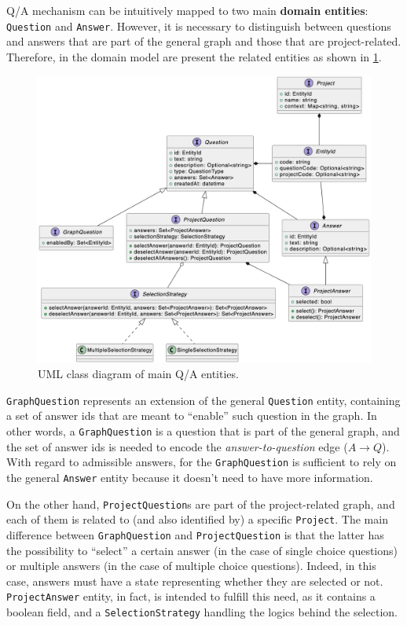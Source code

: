 \documentclass[12pt,a4paper,openright,twoside]{book}
\begin{document}
\ac{Q/A} mechanism can be intuitively mapped to two main \textbf{domain entities}: \texttt{Question} and \texttt{Answer}.
%
However, it is necessary to distinguish between questions and answers that are part of the general graph and those that are project-related.
%
Therefore, in the domain model are present the related entities as shown in \cref{fig:entities}.

\begin{figure}
    \centering
    \includegraphics[width=\linewidth]{figures/diagrams/entities.png}
    \caption{
        UML class diagram of main \ac{Q/A} entities.
    }
    \label{fig:entities}
\end{figure}

\texttt{GraphQuestion} represents an extension of the general \texttt{Question} entity, containing a set of answer ids that are meant to ``enable'' such question in the graph.
%
In other words, a \texttt{GraphQuestion} is a question that is part of the general graph, and the set of answer ids is needed to encode the \textit{answer-to-question} edge ($A \to Q$).
%
With regard to admissible answers, for the \texttt{GraphQuestion} is sufficient to rely on the general \texttt{Answer} entity because it doesn't need to have more information.

On the other hand, \texttt{ProjectQuestion}s are part of the project-related graph, and each of them is related to (and also identified by) a specific \texttt{Project}.
%
The main difference between \texttt{GraphQuestion} and \texttt{ProjectQuestion} is that the latter has the possibility to ``select'' a certain answer (in the case of single choice questions) or multiple answers (in the case of multiple choice questions).
%
Indeed, in this case, answers must have a state representing whether they are selected or not.
%
\texttt{ProjectAnswer} entity, in fact, is intended to fulfill this need, as it contains a boolean field, and a \texttt{SelectionStrategy} handling the logics behind the selection.
\end{document}
